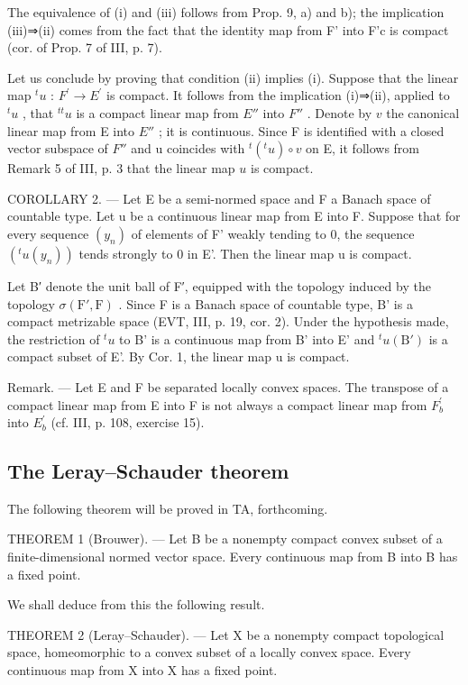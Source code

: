 The equivalence of (i) and (iii) follows from Prop. 9, a) and b); the implication (iii)⇒(ii) comes from the fact that the identity map from F' into F'c is compact (cor. of Prop. 7 of III, p. 7).

Let us conclude by proving that condition (ii) implies (i). Suppose that the linear map \({}^{t}u\) : \(F^{\prime} \to E^{\prime}\) is compact. It follows from the implication (i)⇒(ii), applied to \({}^{t}u\) , that \({}^{tt}u\) is a compact linear map from \(E''\) into \(F''\) . Denote by \(v\) the canonical linear map from E into \(E''\) ; it is continuous. Since F is identified with a closed vector subspace of \(F''\) and u coincides with \({}^{t}({}^{t}u) \circ v\) on E, it follows from Remark 5 of III, p. 3 that the linear map \(u\) is compact.

COROLLARY 2. --- Let E be a semi-normed space and F a Banach space of countable type. Let u be a continuous linear map from E into F. Suppose that for every sequence \((y_{n})\) of elements of F' weakly tending to 0, the sequence \((^{t}u(y_{n}))\) tends strongly to 0 in E'. Then the linear map u is compact.

Let B′ denote the unit ball of F′, equipped with the topology induced by the topology \(\sigma(\mathrm{F}',\mathrm{F})\) . Since F is a Banach space of countable type, B' is a compact metrizable space (EVT, III, p. 19, cor. 2). Under the hypothesis made, the restriction of \({}^{t}u\) to B' is a continuous map from B' into E' and \({}^{t}u(\mathrm{B}')\) is a compact subset of E'. By Cor. 1, the linear map u is compact.

Remark. --- Let E and F be separated locally convex spaces. The transpose of a compact linear map from E into F is not always a compact linear map from \(F_{b}^{\prime}\) into \(E_{b}^{\prime}\) (cf. III, p. 108, exercise 15).

\subsection{The Leray--Schauder theorem}

The following theorem will be proved in TA, forthcoming.

THEOREM 1 (Brouwer). --- Let B be a nonempty compact convex subset of a finite-dimensional normed vector space. Every continuous map from B into B has a fixed point.

We shall deduce from this the following result.

THEOREM 2 (Leray--Schauder). --- Let X be a nonempty compact topological space, homeomorphic to a convex subset of a locally convex space. Every continuous map from X into X has a fixed point.

